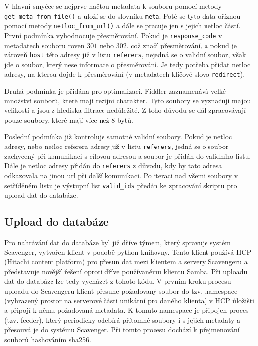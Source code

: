 \documentclass[thesis=M,czech,hidelinks]{FITthesis}[2013/05/06]
\begin{document}
V hlavní smyčce se nejprve načtou metadata k souboru pomocí metody \texttt{get_meta_from_file()} a uloží se do slovníku \texttt{meta}. Poté se tyto data oříznou pomocí metody \texttt{netloc_from_url()} a dále se pracuje jen s jejich netloc částí. První podmínka vyhodnocuje přesměrování. Pokud je \texttt{response_code} v metadatech souboru roven $301$ nebo $302$, což značí přesměrování, a pokud je zároveň \texttt{host} této adresy již v listu \texttt{referers}, nejedná se o validní soubor, však jde o soubor, který nese informace o přesměrování. Je tedy potřeba přidat netloc adresy, na kterou dojde k přesměrování (v metadatech klíčové slovo \texttt{redirect}). 

Druhá podmínka je přidána pro optimalizaci. Fiddler zaznamenává velké množství souborů, které mají režijní charakter. Tyto soubory se vyznačují majou velikostí a jsou z hlediska filtrace nedůležité. Z toho důvodu se dál zpracovávají pouze soubory, které mají více než 8 bytů.

Poslední podmínka již kontroluje samotné validní soubory. Pokud je netloc adresy, nebo netloc referera adresy již v listu \texttt{referers}, jedná se o soubor zachycený při komunikaci s cílovou adresou a soubor je přidán do validního listu. Dále je netloc adresy přidán do \texttt{referers} z důvodu, kdy by tato adresa odkazovala na jinou url při další komunikaci. Po iteraci nad všemi soubory v setříděném listu je výstupní list \texttt{valid_ids} předán ke zpracování skriptu pro upload dat do databáze.





\subsection{Upload do databáze}
Pro nahrávání dat do databáze byl již dříve týmem, který spravuje systém Scavenger, vytvořen klient v podobě python knihovny. Tento klient používá HCP (Hitachi content platform) pro přesun dat mezi klientem a servery Scavengeru a představuje novější řešení oproti dříve používanému klientu Samba. Při uploadu dat do databáze lze tedy vycházet z tohoto kódu. V prvním kroku procesu uploadu do Scavengeru klient přesune požadovaný soubor do tzv. namespace (vyhrazený prostor na serverové části unikátní pro daného klienta) v HCP úložišti a připojí k němu požadovaná metadata. K tomuto namespace je připojen proces (tzv. feeder), který periodicky odebírá přítomné soubory i s jejich metadaty a přesouvá je do systému Scavenger. Při tomto procesu dochází k přejmenování souborů hashováním sha256.
\end{document}

